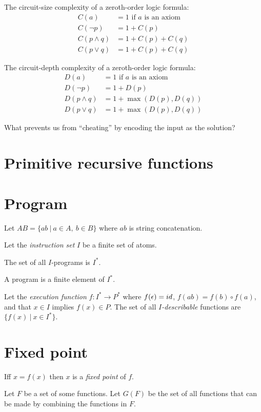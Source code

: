 The circuit-size complexity of a zeroth-order logic formula:
\begin{align*}
    C(a) &= 1 \text{ if \(a\) is an axiom}
    \\
    C(\neg p) &= 1 + C(p)
    \\
    C(p \wedge q) &= 1 + C(p) + C(q)
    \\
    C(p \vee q) &= 1 + C(p) + C(q)
\end{align*}

The circuit-depth complexity of a zeroth-order logic formula:
\begin{align*}
    D(a) &= 1 \text{ if \(a\) is an axiom}
    \\
    D(\neg p) &= 1 + D(p)
    \\
    D(p \wedge q) &= 1 + \max(D(p),D(q))
    \\
    D(p \vee q) &= 1 + \max(D(p),D(q))
\end{align*}

What prevents us from ``cheating'' by encoding the input as the solution?

\section{Primitive recursive functions}

\section{Program}

Let \(AB = \{ ab ~|~ a \in A, ~ b \in B \}\)
where \(ab\) is string concatenation.

Let the \emph{instruction set} \(I\) be a finite set of atoms.

The set of all \(I\)-programs is \(I^*\).

A program is a finite element of \(I^*\).

Let the \emph{execution function} \(f : I^* \to P^*\)
where
\(f(\epsilon) = id\),
\(f(ab) = f(b) \circ f(a)\),
and that \(x \in I\) implies \(f(x) \in P\).
The set of all \emph{\(I\)-describable} functions are \(\{ f(x) ~|~ x \in I^* \}\).

\section{Fixed point}

Iff \(x = f(x)\) then \(x\) is a \emph{fixed point} of \(f\).

Let \(F\) be a set of some functions.
Let \(G(F)\) be the set of all functions that can be made by combining the functions in \(F\).

